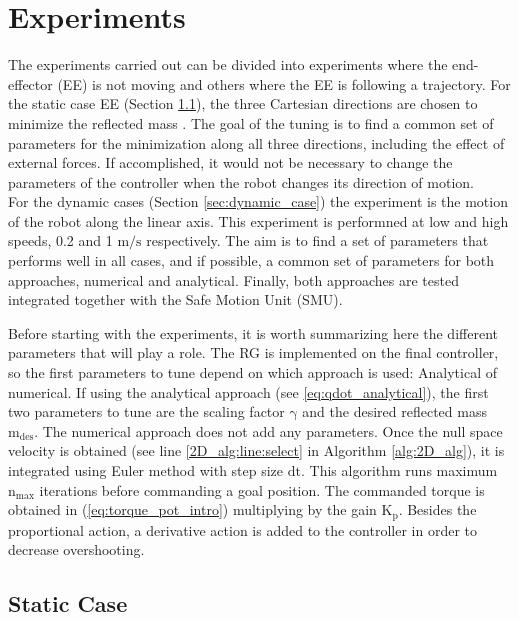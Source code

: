 \chapter{Experiments}
\label{ch:experiments}



The experiments carried out can be divided into experiments where the end-effector (EE) is not moving  and others where the EE is following a trajectory. 
For the static case EE (Section \ref{sec:static_case}), the three Cartesian directions are chosen to minimize the reflected mass . The goal of the tuning is to find a common set of parameters for the minimization along all three directions, including the effect of external forces. If accomplished, it would not be necessary to change the parameters of the controller when the robot changes its direction of motion.\\
%
For the dynamic cases (Section \ref{sec:dynamic_case}) the  experiment is the motion of the robot along the linear axis. This experiment is performned at low and high speeds, 0.2 and 1 $\mathrm{m/s}$ respectively. 
The aim is to find a set of parameters that performs well in all cases, and if possible, a common set of parameters for both approaches, numerical and analytical.
Finally, both approaches are tested integrated together with the Safe Motion Unit (SMU). 

Before starting with the experiments, it is worth summarizing here the different parameters that will play a role. 
The RG is implemented on the final controller, so the first parameters to tune depend on which approach is used: Analytical of numerical. If using the analytical approach (see \ref{eq:qdot_analytical}), the first two parameters to tune are the scaling factor $\mathrm{\gamma}$ and the desired reflected mass $\mathrm{m_{des}}$. The numerical approach does not add any parameters. Once the null space velocity is obtained (see line \ref{2D_alg:line:select} in Algorithm \ref{alg:2D_alg}), it is integrated using Euler method with step size $\mathrm{dt}$. This algorithm runs maximum $\mathrm{n_{max}}$ iterations before commanding a goal position. The commanded torque is obtained in (\ref{eq:torque_pot_intro}) multiplying by the gain $\mathrm{K_p}$. Besides the proportional action, a derivative action is added to the controller in order to decrease overshooting.



\section{Static Case} 
\label{sec:static_case}







